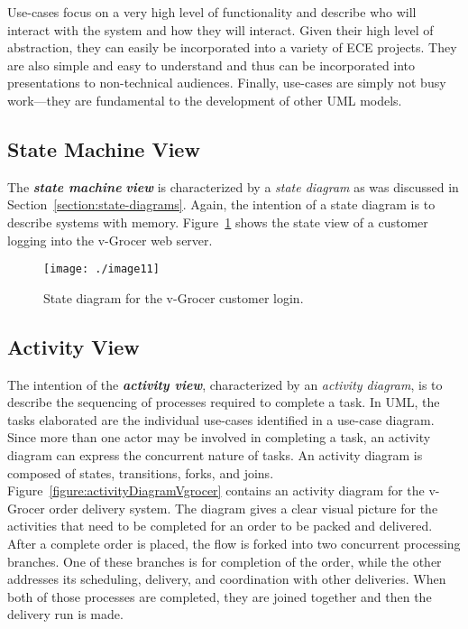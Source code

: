 Use-cases focus on a very high level of functionality and describe who
will interact with the system and how they will interact. Given their
high level of abstraction, they can easily be incorporated into a
variety of ECE projects. They are also simple and easy to understand and
thus can be incorporated into presentations to non-technical audiences.
Finally, use-cases are simply not busy work---they are fundamental to
the development of other UML models.

\subsection{State Machine View}
\label{subsection:state-machine-view}

The \emph{\textbf{state machine}} \emph{\textbf{view}} is characterized
by a \emph{state diagram} as was discussed in 
Section~\ref{section:state-diagrams}. Again, the
intention of a state diagram is to describe systems with memory. 
Figure~\ref{figure:stateDiagramVgrocer} shows the state 
view of a customer logging into the v-Grocer web
server.


\begin{figure}[h]
\centering
\texttt{[image: ./image11]}
\caption{State diagram for the v-Grocer customer login.}
\label{figure:stateDiagramVgrocer}
\end{figure}

\subsection{Activity View}
\label{subsection:activity-view}

The intention of the \emph{\textbf{activity view}}, characterized by an
\emph{activity diagram}, is to describe the sequencing of processes
required to complete a task. In UML, the tasks elaborated are the
individual use-cases identified in a use-case diagram. Since more than
one actor may be involved in completing a task, an activity diagram can
express the concurrent nature of tasks. An activity diagram is composed
of states, transitions, forks, and joins. 
Figure~\ref{figure:activityDiagramVgrocer} contains an
activity diagram for the v-Grocer order delivery system. The diagram
gives a clear visual picture for the activities that need to be
completed for an order to be packed and delivered. After a complete
order is placed, the flow is forked into two concurrent processing
branches. One of these branches is for completion of the order, while
the other addresses its scheduling, delivery, and coordination with
other deliveries. When both of those processes are completed, they are
joined together and then the delivery run is made.


